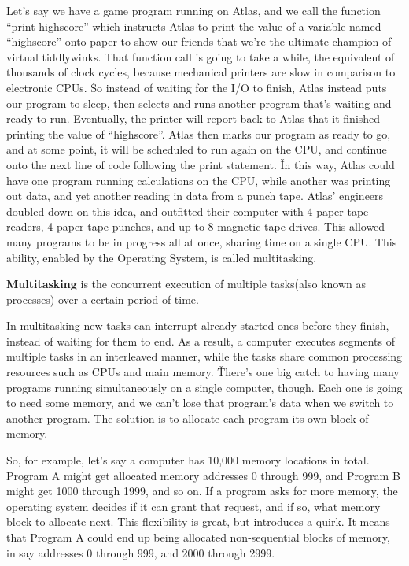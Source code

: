 \be
Let's say we have a game program running on Atlas, and we call the function “print highscore” which instructs Atlas
to print the value of a variable named “highscore” onto paper to show our friends that we're the ultimate champion of
virtual tiddlywinks. That function call is going to take a while, the equivalent of thousands of clock cycles,
because mechanical printers are slow in comparison to electronic CPUs. \v

So instead of waiting for the I/O to finish, Atlas instead puts our program to sleep, then selects and runs another
program that's waiting and ready to run. Eventually, the printer will report back to Atlas that it finished printing
the value of “highscore”. Atlas then marks our program as ready to go, and at some point, it will be scheduled to run
again on the CPU, and continue onto the next line of code following the print statement. \v

In this way, Atlas could have one program running calculations on the CPU, while another was printing out data, and
yet another reading in data from a punch tape. Atlas' engineers doubled down on this idea, and outfitted their
computer with 4 paper tape readers, 4 paper tape punches, and up to 8 magnetic tape drives. This allowed many
programs to be in progress all at once, sharing time on a single CPU. This ability, enabled by the Operating System,
is called multitasking.
\ee

\bd[Multitasking]
\textbf{Multitasking} is the concurrent execution of multiple tasks(also known as processes) over a certain period of
time.
\ed

In multitasking new tasks can interrupt already started ones before they finish, instead of waiting for them to end.
As a result, a computer executes segments of multiple tasks in an interleaved manner, while the tasks share common
processing resources such as CPUs and main memory. \v

There's one big catch to having many programs running simultaneously on a single computer, though. Each one is going
to need some memory, and we can't lose that program's data when we switch to another program. The solution is to
allocate each program its own block of memory.

\be
So, for example, let's say a computer has 10,000 memory locations in total. Program A might get allocated memory
addresses 0 through 999, and Program B might get 1000 through 1999, and so on. If a program asks for more memory, the
operating system decides if it can grant that request, and if so, what memory block to allocate next. This
flexibility is great, but introduces a quirk. It means that Program A could end up being allocated non-sequential
blocks of memory, in say addresses 0 through 999, and 2000 through 2999.
\ee

